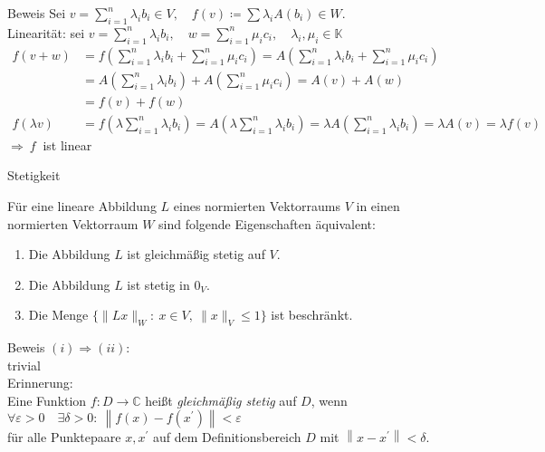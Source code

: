 \documentclass[AERbeamer%
,optBeamerClassicFormat%
,optLeftEquations   %
]{AERlatex}
\begin{document}
%
    \begin{frame}{Beweis}
        \setlength{\baselineskip}{1.6\baselineskip}
%
        Sei $v=\sum_{i=1}^n \lambda_i b_i \in V, \quad f(v)\coloneqq\sum \lambda_i A\left(b_i\right) \in W$. \\
        Linearität: sei $v=\sum_{i=1}^n \lambda_i b_i, \quad w=\sum_{i=1}^n \mu_i c_i, \quad \lambda_i, \mu_i \in \mathbb{K}$
        \begin{equation*}
            \begin{aligned}
                f(v+w) &=f\left(\sum_{i=1}^n \lambda_i b_i+\sum_{i=1}^n \mu_i c_i\right)=A\left(\sum_{i=1}^n \lambda_i b_i+\sum_{i=1}^n \mu_i c_i\right) \\
                &=A\left(\sum_{i=1}^n \lambda_i b_i\right)+A\left(\sum_{i=1}^n \mu_i c_i\right)=A(v)+A(w) \\
                &=f(v)+f(w) \\
                f\left(\lambda v\right) &=f\left(\lambda \sum_{i=1}^n \lambda_i b_i\right)=A\left(\lambda \sum_{i=1}^n \lambda_i b_i\right)=\lambda A\left(\sum_{i=1}^n \lambda_i b_i\right)=\lambda A(v)=\lambda f(v)
            \end{aligned}
        \end{equation*}
        $\Rightarrow ~ f ~$ ist linear
    \end{frame}
%
%
    \begin{frame}{Stetigkeit}
        \begin{Satz}
            Für eine lineare Abbildung $L$ eines normierten Vektorraums $V$ in einen normierten Vektorraum $W$ sind folgende Eigenschaften äquivalent:
            \begin{enumerate}
                [label=$(\roman*)$, leftmargin=2em]
                \item Die Abbildung $L$ ist gleichmäßig stetig auf $V$.
                \item Die Abbildung $L$ ist stetig in $0_V$.
                \item Die Menge $\{\|Lx\|_W: ~ x \in V, ~ \|x\|_V \leq 1\}$ ist beschränkt.
            \end{enumerate}
        \end{Satz}
    \end{frame}
%
    \begin{frame}{Beweis}
        \setlength{\baselineskip}{1.6\baselineskip}
%
        $(i) \Rightarrow (ii)$:\\ \pause
        trivial \\ \pause
        \vspace{1em}
        Erinnerung: \\
        Eine Funktion $f: D \rightarrow \mathbb{C}$ heißt \emph{gleichmäßig stetig} auf $D$, wenn \\
        $\forall \varepsilon>0 \quad \exists \delta>0: ~ \left\|f(x)-f\left(x^{\prime}\right)\right\|<\varepsilon$ \\
        für alle Punktepaare $x, x^{\prime}$ auf dem Definitionsbereich $D$ mit $\left\|x-x^{\prime}\right\|<\delta$.
    \end{frame}
\end{document}

